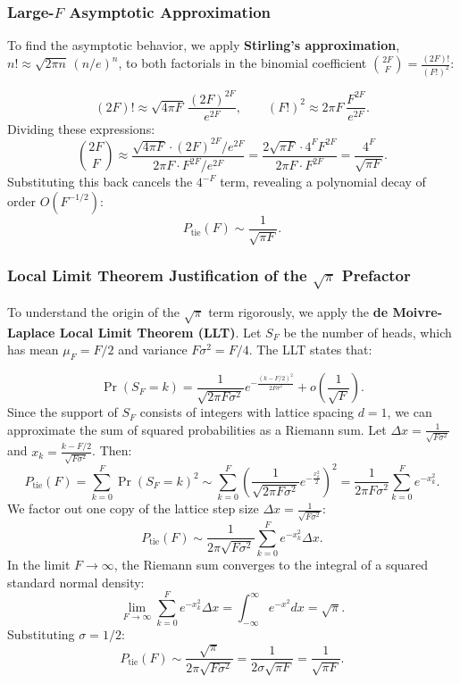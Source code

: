 \documentclass[
  letterpaper,
  DIV=11,
  numbers=noendperiod]{scrartcl}
\begin{document}
\subsubsection{\texorpdfstring{Large-\(F\) Asymptotic
Approximation}{Large-F Asymptotic Approximation}}\label{large-f-asymptotic-approximation}

To find the asymptotic behavior, we apply \textbf{Stirling's
approximation}, \(n! \approx \sqrt{2\pi n}\,(n/e)^n\), to both
factorials in the binomial coefficient
\(\binom{2F}{F} = \frac{(2F)!}{(F!)^2}\):

\[
(2F)! \approx \sqrt{4\pi F}\,\frac{(2F)^{2F}}{e^{2F}}, \qquad
(F!)^2 \approx 2\pi F\,\frac{F^{2F}}{e^{2F}}.
\] Dividing these expressions: \[
\binom{2F}{F} \approx \frac{\sqrt{4\pi F} \cdot (2F)^{2F} / e^{2F}}{2\pi F \cdot F^{2F} / e^{2F}} = \frac{2\sqrt{\pi F} \cdot 4^F F^{2F}}{2\pi F \cdot F^{2F}} = \frac{4^F}{\sqrt{\pi F}}.
\] Substituting this back cancels the \(4^{-F}\) term, revealing a
polynomial decay of order \(O(F^{-1/2})\): \[
P_{\text{tie}}(F) \sim \frac{1}{\sqrt{\pi F}}.
\]

\subsubsection{\texorpdfstring{Local Limit Theorem Justification of the
\(\sqrt{\pi}\)
Prefactor}{Local Limit Theorem Justification of the \textbackslash sqrt\{\textbackslash pi\} Prefactor}}\label{local-limit-theorem-justification-of-the-sqrtpi-prefactor}

To understand the origin of the \(\sqrt{\pi}\) term rigorously, we apply
the \textbf{de Moivre-Laplace Local Limit Theorem (LLT)}. Let \(S_F\) be
the number of heads, which has mean \(\mu_F = F/2\) and variance
\(F \sigma^2 = F/4\). The LLT states that:

\[
\Pr(S_F = k) = \frac{1}{\sqrt{2\pi F \sigma^2}} e^{-\frac{(k - F/2)^2}{2F\sigma^2}} + o\left(\frac{1}{\sqrt{F}}\right).
\] Since the support of \(S_F\) consists of integers with lattice
spacing \(d = 1\), we can approximate the sum of squared probabilities
as a Riemann sum. Let \(\Delta x = \frac{1}{\sqrt{F\sigma^2}}\) and
\(x_k = \frac{k - F/2}{\sqrt{F\sigma^2}}\). Then: \[
P_{\text{tie}}(F) = \sum_{k=0}^{F} \Pr(S_F = k)^2 \sim \sum_{k=0}^{F} \left( \frac{1}{\sqrt{2\pi F \sigma^2}} e^{-\frac{x_k^2}{2}} \right)^2 = \frac{1}{2\pi F \sigma^2} \sum_{k=0}^{F} e^{-x_k^2}.
\] We factor out one copy of the lattice step size
\(\Delta x = \frac{1}{\sqrt{F\sigma^2}}\): \[
P_{\text{tie}}(F) \sim \frac{1}{2\pi \sqrt{F \sigma^2}} \sum_{k=0}^{F} e^{-x_k^2} \Delta x.
\] In the limit \(F \to \infty\), the Riemann sum converges to the
integral of a squared standard normal density: \[
\lim_{F \to \infty} \sum_{k=0}^{F} e^{-x_k^2} \Delta x = \int_{-\infty}^{\infty} e^{-x^2} dx = \sqrt{\pi}.
\] Substituting \(\sigma = 1/2\): \[
P_{\text{tie}}(F) \sim \frac{\sqrt{\pi}}{2\pi \sqrt{F \sigma^2}} = \frac{1}{2 \sigma \sqrt{\pi F}} = \frac{1}{\sqrt{\pi F}}.
\]
\end{document}
